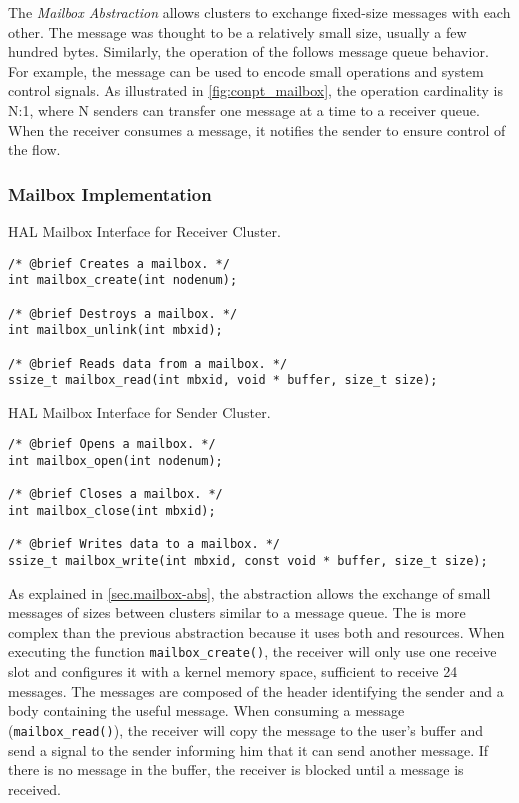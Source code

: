 
			The \textit{Mailbox Abstraction} allows clusters to exchange fixed-size
			messages with each other.
			The message was thought to be a relatively small size, usually a few hundred bytes.
			Similarly, the operation of the \mailbox follows \posix message queue behavior.
			For example, the message can be used to encode small operations and system
			control signals.
			As illustrated in \autoref{fig:conpt_mailbox}, the operation cardinality is N:1,
			where N senders can transfer one message at a time to a receiver queue.
			When the receiver consumes a message, it notifies the sender to ensure
			control of the flow.

			\subsubsection*{Mailbox Implementation}

\begin{listing}[!tb]
\caption{HAL Mailbox Interface for Receiver Cluster.}
\label{code:mailbox-receiver}
\begin{verbatim}
/* @brief Creates a mailbox. */
int mailbox_create(int nodenum);

/* @brief Destroys a mailbox. */
int mailbox_unlink(int mbxid);

/* @brief Reads data from a mailbox. */
ssize_t mailbox_read(int mbxid, void * buffer, size_t size);
\end{verbatim}
\end{listing}

\begin{listing}[!tb]
\caption{HAL Mailbox Interface for Sender Cluster.}
\label{code:mailbox-sender}
\begin{verbatim}
/* @brief Opens a mailbox. */
int mailbox_open(int nodenum);

/* @brief Closes a mailbox. */
int mailbox_close(int mbxid);

/* @brief Writes data to a mailbox. */
ssize_t mailbox_write(int mbxid, const void * buffer, size_t size);
\end{verbatim}
\end{listing}

				As explained in \autoref{sec.mailbox-abs}, the \mailbox abstraction
				allows the exchange of small messages of sizes between clusters similar
				to a \posix message queue.
				The \mailbox is more complex than the previous abstraction because it
				uses both \dnoc and \cnoc resources.
				When executing the function \texttt{mailbox\_create()}, the receiver
				will only use one \dnoc receive slot and configures it with a kernel
				memory space, sufficient to receive 24 messages.
				The messages are composed of the header identifying the sender
				and a body containing the useful message.
				When consuming a message (\texttt{mailbox\_read()}), the receiver
				will copy the message to the user's buffer and send a signal
				to the sender informing him that it can send another message.
				If there is no message in the buffer, the receiver is blocked
				until a message is received.


